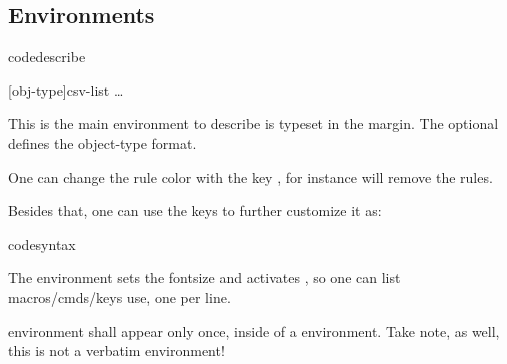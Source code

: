 \documentclass{article}
\begin{document}
\subsection{Environments}
\begin{codedescribe}[env,new=2023/05/01,update=2023/05/1,note={this is an example}]{codedescribe}
\begin{codesyntax}
\tsmacro{\begin{codedescribe}}[obj-type]{csv-list}
\ldots
\tsmacro{\end{codedescribe}}{}
\end{codesyntax}
This is the main environment to describe    is typeset in the margin. The optional  defines the object-type format. 
\end{codedescribe}
\begin{tsremark}
One can change the rule color with the key , for instance \tsmacro{\begin{codedescribe}[rulecolor=white]}{} will remove the rules.
\end{tsremark}
\begin{tsremark}
Besides that, one can use the keys  to further customize it as: \tsverb{\begin{codedescribe}[new=2023/05/01,update=2023/05/1,note={this is an example}]}
\end{tsremark}


\begin{codedescribe}[env]{codesyntax}
\begin{codesyntax}
\tsmacro{\begin{codesyntax}}{}
\end{codesyntax}
The  environment sets the fontsize and activates \tsmacro{\obeylines,\obeyspaces}{}, so one can list macros/cmds/keys use, one per line.

\end{codedescribe}

\begin{tsremark}
 environment shall appear only once, inside of a  environment. Take note, as well, this is not a verbatim environment!
%
\end{tsremark}
\end{document}
